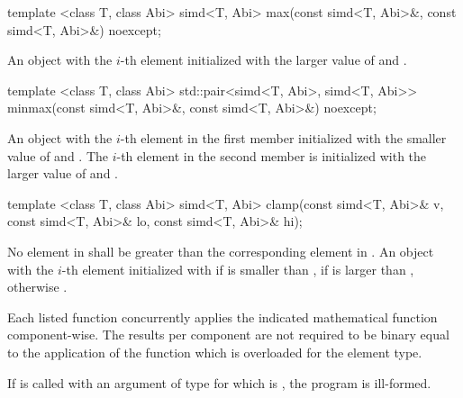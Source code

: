 \begin{itemdecl}
template <class T, class Abi> simd<T, Abi> max(const simd<T, Abi>&, const simd<T, Abi>&) noexcept;
\end{itemdecl}
\begin{itemdescr}
  \pnum\returns An object with the $i$-th element initialized with the larger value of  and  \foralli.
\end{itemdescr}

\begin{itemdecl}
template <class T, class Abi>
std::pair<simd<T, Abi>, simd<T, Abi>> minmax(const simd<T, Abi>&, const simd<T, Abi>&) noexcept;
\end{itemdecl}
\begin{itemdescr}
  \pnum\returns An object with the $i$-th element in the first  member initialized with the smaller value of  and  \foralli.
  The $i$-th element in the second  member is initialized with the larger value of  and  \foralli.
\end{itemdescr}

\begin{itemdecl}
template <class T, class Abi>
simd<T, Abi> clamp(const simd<T, Abi>& v, const simd<T, Abi>& lo, const simd<T, Abi>& hi);
\end{itemdecl}
\begin{itemdescr}
  \pnum\requires No element in  shall be greater than the corresponding element in .
  \pnum\returns An object with the $i$-th element initialized with  if  is smaller than ,  if  is larger than , otherwise  \foralli.
\end{itemdescr}



\pnum Each listed function concurrently applies the indicated mathematical function component-wise.
The results per component are not required to be binary equal to the application of the function which is overloaded for the element type.

\pnum If  is called with an argument of type \simd[<X, Abi>] for which  is \true, the program is ill-formed.

